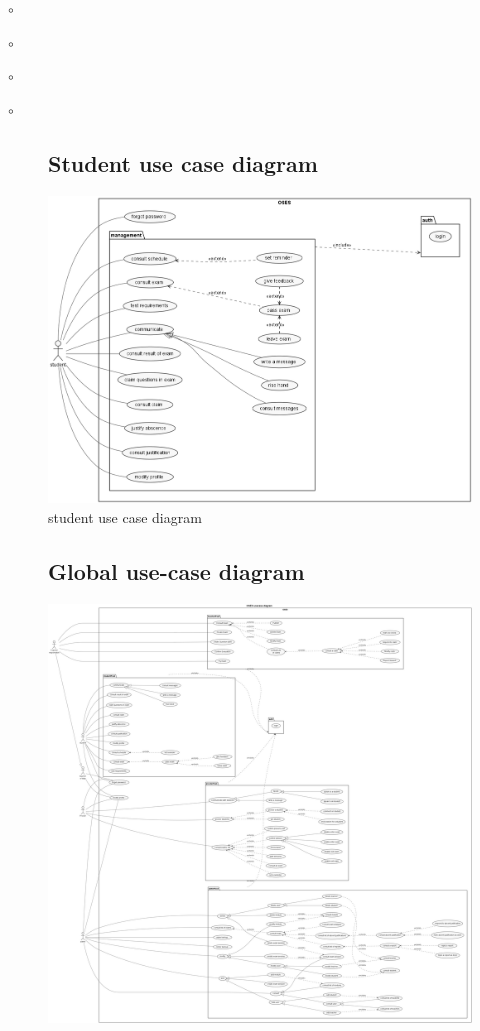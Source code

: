 \documentclass[]{uc2pfecaneva}
\begin{document}
\begin{list}{$\circ$}{}
\begin{list}{$\circ$}{}
\begin{list}{$\circ$}{}
\begin{list}{$\circ$}{}
\begin{figure}
        \subsection{Student use case diagram}
        \centering
        \includegraphics[width=350pt]{images/student_UCD}
        \caption{student use case diagram}
    \end{figure}



    \begin{figure}[ht]

        \subsection{Global use-case diagram}

        \centering
        \includegraphics[width=\textwidth]{images/GUCD}


\end{figure}
\end{list}
\end{list}
\end{list}
\end{list}
\end{document}
